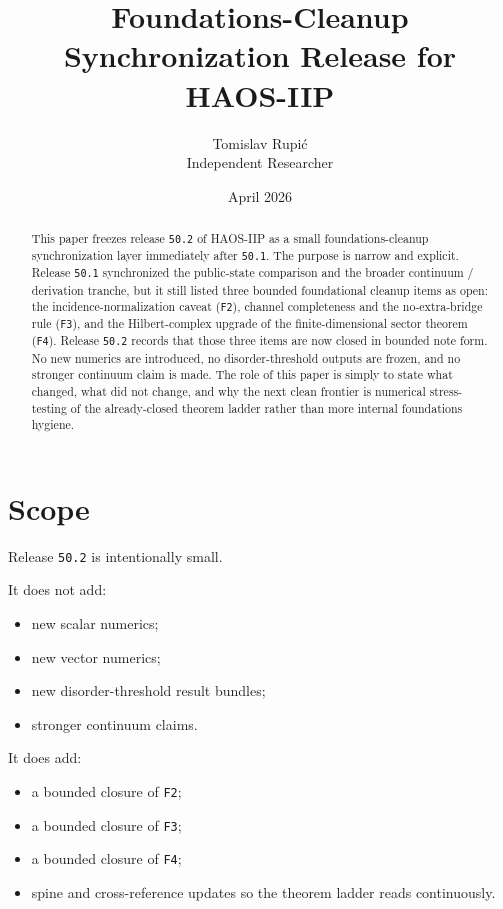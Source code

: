 \documentclass[11pt]{article}
\title{Foundations-Cleanup Synchronization Release for HAOS-IIP}
\author{Tomislav Rupi\'c \\ Independent Researcher}
\date{April 2026}
\begin{document}
\maketitle

\begin{abstract}
This paper freezes release \texttt{50.2} of HAOS-IIP as a small foundations-cleanup synchronization layer immediately after \texttt{50.1}. The purpose is narrow and explicit. Release \texttt{50.1} synchronized the public-state comparison and the broader continuum / derivation tranche, but it still listed three bounded foundational cleanup items as open: the incidence-normalization caveat (\texttt{F2}), channel completeness and the no-extra-bridge rule (\texttt{F3}), and the Hilbert-complex upgrade of the finite-dimensional sector theorem (\texttt{F4}). Release \texttt{50.2} records that those three items are now closed in bounded note form. No new numerics are introduced, no disorder-threshold outputs are frozen, and no stronger continuum claim is made. The role of this paper is simply to state what changed, what did not change, and why the next clean frontier is numerical stress-testing of the already-closed theorem ladder rather than more internal foundations hygiene.
\end{abstract}

\tableofcontents

\section{Scope}

Release \texttt{50.2} is intentionally small.

It does not add:
\begin{itemize}
\item new scalar numerics;
\item new vector numerics;
\item new disorder-threshold result bundles;
\item stronger continuum claims.
\end{itemize}

It does add:
\begin{itemize}
\item a bounded closure of \texttt{F2};
\item a bounded closure of \texttt{F3};
\item a bounded closure of \texttt{F4};
\item spine and cross-reference updates so the theorem ladder reads continuously.
\end{itemize}
\end{document}
